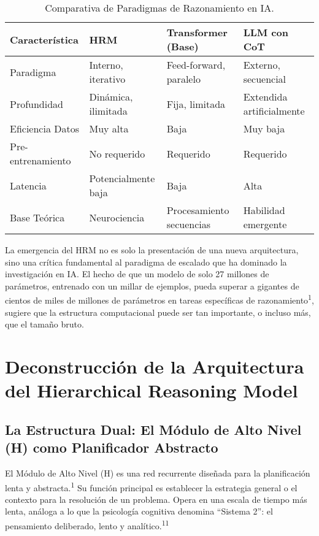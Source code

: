 \documentclass{article}
\begin{document}
	\begin{table}[h!]
		\centering
		\caption{Comparativa de Paradigmas de Razonamiento en IA.}
		\label{tab:comparativa_ia}
		\begin{tabular}{@{}llll@{}}
			\toprule
			\textbf{Característica} & \textbf{HRM} & \textbf{Transformer (Base)} & \textbf{LLM con CoT} \\
			\midrule
			Paradigma & Interno, iterativo & Feed-forward, paralelo & Externo, secuencial \\
			Profundidad & Dinámica, ilimitada & Fija, limitada & Extendida artificialmente \\
			Eficiencia Datos & Muy alta & Baja & Muy baja \\
			Pre-entrenamiento & No requerido & Requerido & Requerido \\
			Latencia & Potencialmente baja & Baja & Alta \\
			Base Teórica & Neurociencia & Procesamiento secuencias & Habilidad emergente \\
			\bottomrule
		\end{tabular}
	\end{table}
	
	La emergencia del HRM no es solo la presentación de una nueva arquitectura, sino una crítica fundamental al paradigma de escalado que ha dominado la investigación en IA. El hecho de que un modelo de solo 27 millones de parámetros, entrenado con un millar de ejemplos, pueda superar a gigantes de cientos de miles de millones de parámetros en tareas específicas de razonamiento\textsuperscript{1}, sugiere que la estructura computacional puede ser tan importante, o incluso más, que el tamaño bruto.
	
	\section{Deconstrucción de la Arquitectura del Hierarchical Reasoning Model}
	
	\subsection{La Estructura Dual: El Módulo de Alto Nivel (H) como Planificador Abstracto}
	El Módulo de Alto Nivel (H) es una red recurrente diseñada para la planificación lenta y abstracta.\textsuperscript{1} Su función principal es establecer la estrategia general o el contexto para la resolución de un problema. Opera en una escala de tiempo más lenta, análoga a lo que la psicología cognitiva denomina ``Sistema 2'': el pensamiento deliberado, lento y analítico.\textsuperscript{11}
	
\end{document}
